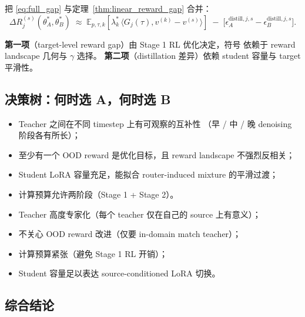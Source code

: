 \documentclass[11pt,a4paper]{article}
\newcommand{\E}{\mathbb{E}}
\theoremstyle{definition}
\begin{document}
把 \eqref{eq:full_gap} 与定理~\ref{thm:linear_reward_gap} 合并：
\begin{equation}
\boxed{
\Delta R_j^{(s)}(\theta_A^*, \theta_B^*) \;\approx\;
\E_{p, \tau, k}\!\left[\lambda_k^*\,\langle G_j(\tau), v^{(k)} - v^{(s)}\rangle\right]
\;-\;
\bigl[\epsilon_A^{\text{distill}, j, s} - \epsilon_B^{\text{distill}, j, s}\bigr].
}
\label{eq:summary_gap}
\end{equation}

\textbf{第一项}（target-level reward gap）由 Stage 1 RL 优化决定，符号
依赖于 reward landscape 几何与 $\gamma$ 选择。
\textbf{第二项}（distillation 差异）依赖 student 容量与 target 平滑性。

\subsection{决策树：何时选 A，何时选 B}

\begin{tcolorbox}[colback=green!5, colframe=green!50, title=\textbf{选择 A（MoF$\to$Distill）的条件}]
\begin{itemize}[leftmargin=1.5em]
\item Teacher 之间在不同 timestep 上有可观察的互补性
（早 / 中 / 晚 denoising 阶段各有所长）；
\item 至少有一个 OOD reward 是优化目标，且 reward landscape 不强烈反相关；
\item Student LoRA 容量充足，能拟合 router-induced mixture 的平滑过渡；
\item 计算预算允许两阶段（Stage 1 + Stage 2）。
\end{itemize}
\end{tcolorbox}

\begin{tcolorbox}[colback=red!5, colframe=red!50, title=\textbf{选择 B（route-by-source OPD）的条件}]
\begin{itemize}[leftmargin=1.5em]
\item Teacher 高度专家化（每个 teacher 仅在自己的 source 上有意义）；
\item 不关心 OOD reward 改进（仅要 in-domain match teacher）；
\item 计算预算紧张（避免 Stage 1 RL 开销）；
\item Student 容量足以表达 source-conditioned LoRA 切换。
\end{itemize}
\end{tcolorbox}

\subsection{综合结论}
\end{document}
